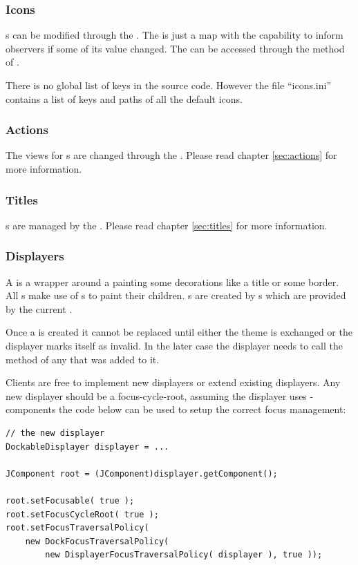 \subsubsection{Icons}
s can be modified through the . The  is just a map with the capability to inform observers if some of its value changed. The  can be accessed through the method  of \linebreak {}.

There is no global list of keys in the source code. However the file ``icons.ini'' contains a list of keys and paths of all the default icons.

\subsubsection{Actions}
The views for s are changed through the . Please read chapter \ref{sec:actions} for more information.

\subsubsection{Titles}
s are managed by the . Please read chapter \ref{sec:titles} for more information.

\subsubsection{Displayers}
A  is a wrapper around a  painting some decorations like a title or some border. All s make use of \linebreak {}s to paint their children. s are created by s which are provided by the current .

Once a  is created it cannot be replaced until either the theme is exchanged or the displayer marks itself as invalid. In the later case the displayer needs to call the  method of any  that was added to it.

Clients are free to implement new displayers or extend existing displayers. Any new displayer should be a focus-cycle-root, assuming the displayer uses -components the code below can be used to setup the correct focus management:
\begin{lstlisting}
// the new displayer
DockableDisplayer displayer = ...

JComponent root = (JComponent)displayer.getComponent();

root.setFocusable( true );
root.setFocusCycleRoot( true );
root.setFocusTraversalPolicy( 
	new DockFocusTraversalPolicy( 
		new DisplayerFocusTraversalPolicy( displayer ), true ));
\end{lstlisting}


